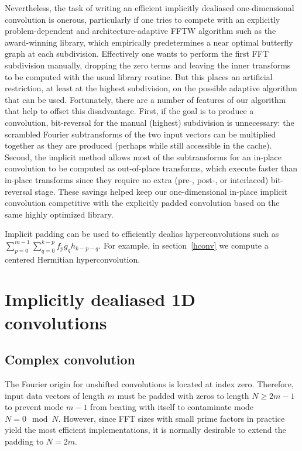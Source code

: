 \documentclass[final]{siamltex}
\begin{document}
Nevertheless, the task of writing an efficient implicitly dealiased
one-dimensional convolution is onerous, particularly if one tries to
compete with an explicitly problem-dependent and architecture-adaptive
FFTW algorithm such as the award-winning \cite{FFTW} library, which
empirically predetermines a near optimal butterfly graph
at each subdivision. Effectively one wants to perform
the first FFT subdivision manually, dropping the zero terms and
leaving the inner transforms to be computed with the usual library
routine. But this places an artificial restriction, at least at the
highest subdivision, on the possible adaptive algorithm that can be
used. Fortunately, there are a number of features of our algorithm
that help to offset this disadvantage. First, if the goal is to
produce a convolution, bit-reversal for the manual (highest)
subdivision is unnecessary: the scrambled Fourier subtransforms of the
two input vectors can be multiplied together as they are produced
(perhaps while still accessible in the cache). Second, the implicit
method allows most of the subtransforms for an in-place convolution to
be computed as out-of-place transforms, which execute faster than
in-place transforms since they require no extra (pre-, post-, or
interlaced) bit-reversal stage.  These savings helped keep our
one-dimensional in-place implicit convolution competitive with the
explicitly padded convolution based on the same highly optimized
library.

Implicit padding can be used to efficiently dealias hyperconvolutions
such as $\sum_{p=0}^{m-1}\sum_{q=0}^{k-p} f_p g_q h_{k-p-q}$. 
For example, in section~\ref{hconv} we compute a centered Hermitian
hyperconvolution.

\section{Implicitly dealiased 1D convolutions}
\subsection{Complex convolution}
The Fourier origin for unshifted convolutions is located at index zero.
Therefore, input data vectors of length $m$ must be padded with zeros to
length $N\ge 2m-1$ to prevent mode $m-1$ from beating with itself to
contaminate mode~$N=0\mod N$. However, since FFT sizes with small prime
factors in practice yield the most efficient implementations, it is normally
desirable to extend the padding to $N=2m$.
\end{document}
